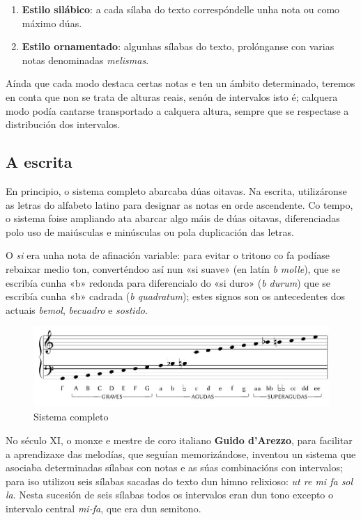 \documentclass[a4paper, twoside]{templates/ociamthesis}
\providecommand{\tightlist}{%
  \setlength{\itemsep}{0pt}\setlength{\parskip}{0pt}}
\begin{document}
\begin{enumerate}
\def\labelenumi{\arabic{enumi}.}
\tightlist
\item
  \textbf{Estilo silábico}: a cada sílaba do texto correspóndelle unha nota ou como máximo dúas.
\item
  \textbf{Estilo ornamentado}: algunhas sílabas do texto, prolónganse con varias notas denominadas \emph{melismas}.
\end{enumerate}

Aínda que cada modo destaca certas notas e ten un ámbito determinado, teremos en conta que non se trata de alturas reais, senón de intervalos isto é; calquera modo podía cantarse transportado a calquera altura, sempre que se respectase a distribución dos intervalos.

\hypertarget{a-escrita}{%
\subsection{A escrita}\label{a-escrita}}

En principio, o sistema completo abarcaba dúas oitavas. Na escrita, utilizáronse as letras do alfabeto latino para designar as notas en orde ascendente. Co tempo, o sistema foise ampliando ata abarcar algo máis de dúas oitavas, diferenciadas polo uso de maiúsculas e minúsculas ou pola duplicación das letras.

O \emph{si} era unha nota de afinación variable: para evitar o tritono co fa podíase rebaixar medio ton, converténdoo así nun «si suave» (en latín \emph{b molle}), que se escribía cunha «b» redonda para diferencialo do «si duro» (\emph{b durum}) que se escribía cunha «b» cadrada (\emph{b quadratum}); estes signos son os antecedentes dos actuais \emph{bemol}, \emph{becuadro} e \emph{sostido}.

\begin{figure}
\centering
\includegraphics{figures/ud-03/sistemaCompleto.jpg}
\caption{Sistema completo}
\end{figure}

No século XI, o monxe e mestre de coro italiano \textbf{Guido d'Arezzo}, para facilitar a aprendizaxe das melodías, que seguían memorizándose, inventou un sistema que asociaba determinadas sílabas con notas e as súas combinacións con intervalos; para iso utilizou seis sílabas sacadas do texto dun himno relixioso: \emph{ut re mi fa sol la}. Nesta sucesión de seis sílabas todos os intervalos eran dun tono excepto o intervalo central \emph{mi-fa}, que era dun semitono.
\end{document}
